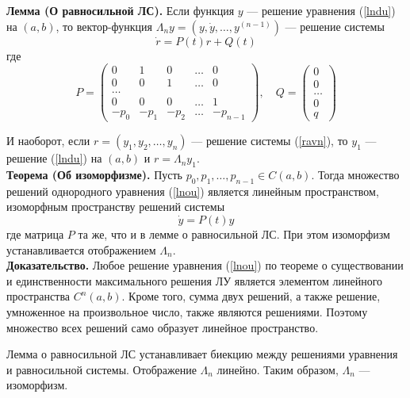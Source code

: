 \documentclass{article}
\begin{document}
\noindent \textbf{Лемма (О равносильной ЛС).} Если функция $y$ --- решение уравнения (\ref{lndu}) на $(a,b)$, то вектор-функция $\Lambda_n y = (y, \dot{y}, \ldots, y^{(n-1)})$ --- решение системы
\begin{equation}
    \dot{r} = P(t)r + Q(t) \label{ravn}
\end{equation}
где
\begin{equation*}
    P = \begin{pmatrix}
    0 & 1 & 0 & \ldots & 0\\
    0 & 0 & 1 & \ldots & 0\\
    \ldots\\
    0 & 0 & 0 & \ldots & 1\\
    -p_0 & -p_1 & -p_2 & \ldots & -p_{n - 1}
    \end{pmatrix}, \quad Q = \begin{pmatrix}
    0\\
    0\\
    \ldots\\
    0\\
    q
    \end{pmatrix}
\end{equation*}

И наоборот, если $r = (y_1, y_2, \ldots, y_n)$ --- решение системы (\ref{ravn}), то $y_1$ --- решение (\ref{lndu}) на $(a,b)$ и $r = \Lambda_n y_1$.\\

\noindent \textbf{Теорема (Об изоморфизме).} Пусть $p_0, p_1, \ldots, p_{n-1} \in C(a,b)$. Тогда множество решений однородного уравнения (\ref{lnou}) является линейным пространством, изоморфным пространству решений системы
\begin{equation}
    \dot{y} = P(t)y \label{izomorf}
\end{equation}
где матрица $P$ та же, что и в лемме о равносильной ЛС. При этом изоморфизм устанавливается отображением $\Lambda_n$.\\

\noindent \textbf{Доказательство.} Любое решение уравнения (\ref{lnou}) по теореме о существовании и единственности максимального решения ЛУ является элементом линейного пространства $C^n(a,b)$. Кроме того, сумма двух решений, а также решение, умноженное на произвольное число, также являются решениями. Поэтому множество всех решений само образует линейное пространство.

Лемма о равносильной ЛС устанавливает биекцию между решениями уравнения и равносильной системы. Отображение $\Lambda_n$ линейно. Таким образом, $\Lambda_n$ --- изоморфизм.\\
\end{document}
